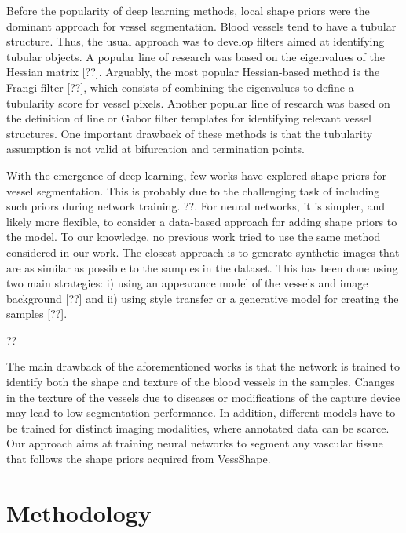 \documentclass[%
reprint,
nofootinbib,
 amsmath,amssymb,
aps,
superscriptaddress,
showkeys,
longbibliography
]{revtex4-1}
\begin{document}
Before the popularity of deep learning methods, local shape priors were the dominant approach for vessel segmentation. Blood vessels tend to have a tubular structure. Thus, the usual approach was to develop filters aimed at identifying tubular objects. A popular line of research was based on the eigenvalues of the Hessian matrix [??]. Arguably, the most popular Hessian-based method is the Frangi filter [??], which consists of combining the eigenvalues to define a tubularity score for vessel pixels. Another popular line of research was based on the definition of line or Gabor filter templates for identifying relevant vessel structures. One important drawback of these methods is that the tubularity assumption is not valid at bifurcation and termination points.

With the emergence of deep learning, few works have explored shape priors for vessel segmentation. This is probably due to the challenging task of including such priors during network training. ??. For neural networks, it is simpler, and likely more flexible, to consider a data-based approach for adding shape priors to the model. To our knowledge, no previous work tried to use the same method considered in our work. The closest approach is to generate synthetic images that are as similar as possible to the samples in the dataset. This has been done using two main strategies: i) using an appearance model of the vessels and image background [??] and ii) using style transfer or a generative model for creating the samples [??]. 

??

The main drawback of the aforementioned works is that the network is trained to identify both the shape and texture of the blood vessels in the samples. Changes in the texture of the vessels due to diseases or modifications of the capture device may lead to low segmentation performance. In addition, different models have to be trained for distinct imaging modalities, where annotated data can be scarce. Our approach aims at training neural networks to segment any vascular tissue that follows the shape priors acquired from VessShape.




\section{Methodology}
\label{s:methodology}
\end{document}
